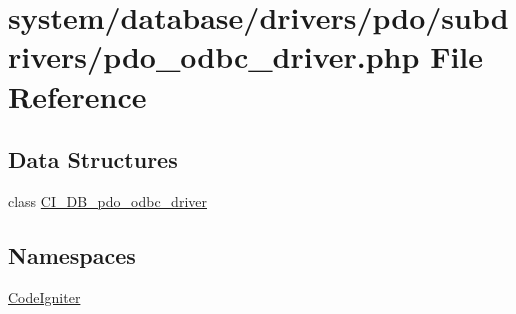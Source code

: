 \hypertarget{pdo__odbc__driver_8php}{}\section{system/database/drivers/pdo/subdrivers/pdo\+\_\+odbc\+\_\+driver.php File Reference}
\label{pdo__odbc__driver_8php}
\subsection*{Data Structures}
\begin{DoxyCompactItemize}
\item 
class \mbox{\hyperlink{class_c_i___d_b__pdo__odbc__driver}{C\+I\+\_\+\+D\+B\+\_\+pdo\+\_\+odbc\+\_\+driver}}
\end{DoxyCompactItemize}
\subsection*{Namespaces}
\begin{DoxyCompactItemize}
\item 
 \mbox{\hyperlink{namespace_code_igniter}{Code\+Igniter}}
\end{DoxyCompactItemize}
